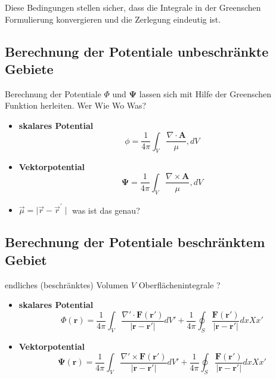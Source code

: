 Diese Bedingungen stellen sicher, dass die Integrale in der Greenschen Formulierung konvergieren und die Zerlegung eindeutig ist.

\subsection{Berechnung der Potentiale unbeschränkte Gebiete
\label{helmholtz:subsection:Berechnung}}


Berechnung der Potentiale $\Phi $ und $\mathbf{\Psi}$ lassen sich mit Hilfe der Greenschen Funktion herleiten. Wer Wie Wo Was?


\begin{itemize}
\item \textbf{skalares Potential}
\begin{equation}
\phi = \frac{1}{4 \pi} \int_{V} \frac{\nabla \cdot \mathbf{A}}{\mu}, dV
\end{equation}
\item \textbf{Vektorpotential}
\begin{equation}
\mathbf{\Psi} = \frac{1}{4 \pi} \int_{V} \frac{\nabla \times \mathbf{A}}{\mu}, dV
\end{equation}
\item $\vec{\mu} = \mid \vec{r} - \vec{r}^{\prime} \mid$ was ist das genau?
\end{itemize}

\subsection{Berechnung der Potentiale beschränktem Gebiet
\label{helmholtz:subsection:BerechnungBeschr}}

endliches (beschränktes) Volumen $V$ Oberflächenintegrale ?

\begin{itemize}
\item \textbf{skalares Potential}
\begin{equation}
\Phi (\mathbf{r}) = \frac{1}{4\pi} \int_V \frac{\nabla' \cdot \mathbf{F}(\mathbf{r}')}{|\mathbf{r} - \mathbf{r}'|} dV' + \frac{1}{4\pi} \oint_S \frac{\mathbf{F}(\mathbf{r}')}{|\mathbf{r} - \mathbf{r}'|} dxXx'
\end{equation}
\item \textbf{Vektorpotential}
\begin{equation}
\mathbf{\Psi}(\mathbf{r}) = \frac{1}{4\pi} \int_V \frac{\nabla' \times \mathbf{F}(\mathbf{r}')}{|\mathbf{r} - \mathbf{r}'|} dV' + \frac{1}{4\pi} \oint_S \frac{\mathbf{F}(\mathbf{r}')}{|\mathbf{r} - \mathbf{r}'|} dxXx'
\end{equation}
\end{itemize}


